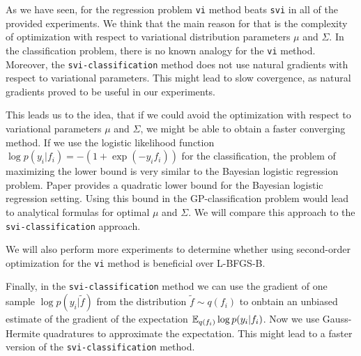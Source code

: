 As we have seen, for the regression problem \lstinline{vi} method beats \lstinline{svi} in all of the provided experiments. We think that the main reason for that is the complexity of optimization with respect to variational distribution parameters $\mu$ and $\Sigma$. In the classification problem, there is no known analogy for the \lstinline{vi} method. Moreover, the  \lstinline{svi-classification} method does not use natural gradients with respect to variational parameters. This might lead to slow covergence, as natural gradients proved to be useful in our experiments.

This leads us to the idea, that if we could avoid the optimization with respect to variational parameters $\mu$ and $\Sigma$, we might be able to obtain a faster converging method. If we use the logistic likelihood function $\log p(y_i | f_i) = -(1 + \exp(-y_i f_i))$ for the classification, the problem of maximizing the lower bound is very similar to the Bayesian logistic regression problem. Paper \cite{JaakkolaJordan} provides a quadratic lower bound for the Bayesian logistic regression setting. Using this bound in the GP-classification problem would lead to analytical formulas for optimal $\mu$ and $\Sigma$. We will compare this approach to the \lstinline{svi-classification} approach.

We will also perform more experiments to determine whether using second-order \linebreak optimization for the \lstinline{vi} method is beneficial over L-BFGS-B.

Finally, in the \lstinline{svi-classification} method we can use the gradient of one sample $\log p(y_i | \tilde f)$ from the distribution $\tilde f \sim q(f_i)$ to onbtain an unbiased estimate of the gradient of the expectation $\mathbb{E}_{q(f_i)} \log p(y_i | f_i)$. Now we use Gauss-Hermite quadratures to approximate the expectation. This might lead to a faster version of the \lstinline{svi-classification} method.